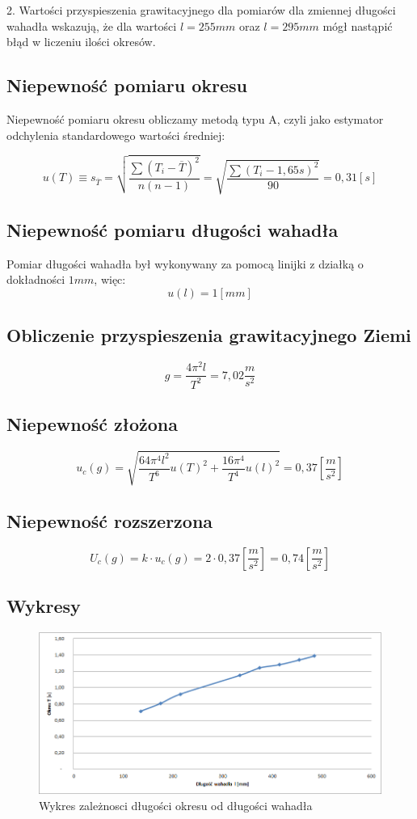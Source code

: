\documentclass[a4paper,10pt,twoside]{article}
\begin{document}
2. Wartości przyspieszenia grawitacyjnego dla pomiarów dla zmiennej długości wahadła wskazują, że dla wartości $l=255mm$ oraz $l=295mm$ mógł nastąpić błąd w liczeniu ilości okresów.

\subsection{Niepewność pomiaru okresu}

Niepewność pomiaru okresu obliczamy metodą typu A, czyli jako estymator odchylenia standardowego wartości średniej:

$$u(T)\equiv s_{\overline{T}} = \sqrt{\frac{\sum{(T_i-\overline{T})^2}}{n(n-1)}} = \sqrt{\frac{\sum{(T_i-1,65s)^2}}{90}} = 0,31 [s] $$

\subsection{Niepewność pomiaru długości wahadła}
Pomiar długości wahadła był wykonywany za pomocą linijki z działką o dokładności $1mm$, więc:
$$u(l)=1 [mm]$$

\subsection{Obliczenie przyspieszenia grawitacyjnego Ziemi}

$$g = \frac{4\pi^2l}{T^2} = 7,02 \frac{m}{s^2}$$

\subsection{Niepewność złożona}

$$u_c(g)=\sqrt{\frac{64\pi^4 l^2}{T^6}u(T)^2+\frac{16\pi^4}{T^4}u(l)^2} =  0,37 [\frac{m}{s^2}]$$

\subsection{Niepewność rozszerzona}

$$U_c(g) = k \cdot u_c(g) = 2 \cdot 0,37 [\frac{m}{s^2}] = 0,74 [\frac{m}{s^2}] $$

\subsection{Wykresy}

\begin{figure}[!htp]
\centerline{\includegraphics[scale=1]{wykres1.png}}
\caption{Wykres zależnosci długości okresu od długości wahadła}
\label{fig:tl}
\end{figure}
\end{document}
